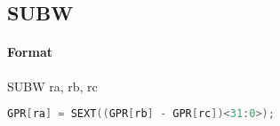 \subsection{SUBW}


\paragraph{Format} SUBW ra, rb, rc

\begin{lstlisting}[language=c]
    GPR[ra] = SEXT((GPR[rb] - GPR[rc])<31:0>);
\end{lstlisting}
